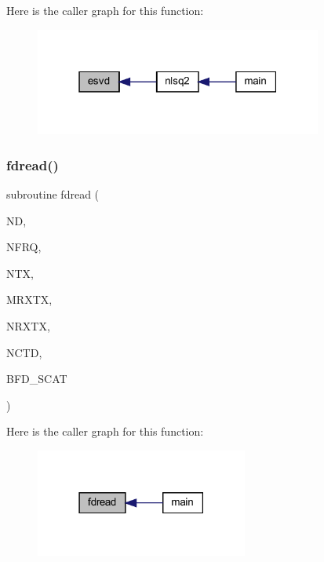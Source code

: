 Here is the caller graph for this function\+:\nopagebreak
\begin{figure}[H]
\begin{center}
\leavevmode
\includegraphics[width=268pt]{Leroi_8f90_a4ee1c663696c56423ddfdd31af7fbaa8_icgraph}
\end{center}
\end{figure}
\mbox{\label{Leroi_8f90_a51b5dc154d226d9db8556fde47af7ae9}} 
\subsubsection{\texorpdfstring{fdread()}{fdread()}}
{\footnotesize\ttfamily subroutine fdread (\begin{DoxyParamCaption}\item[{integer}]{ND,  }\item[{integer}]{N\+F\+RQ,  }\item[{integer}]{N\+TX,  }\item[{integer}]{M\+R\+X\+TX,  }\item[{integer, dimension(ntx)}]{N\+R\+X\+TX,  }\item[{integer, dimension(mrxtx,ntx)}]{N\+C\+TD,  }\item[{complex, dimension(nfrq,mrxtx,ntx,3)}]{B\+F\+D\+\_\+\+S\+C\+AT }\end{DoxyParamCaption})}

Here is the caller graph for this function\+:\nopagebreak
\begin{figure}[H]
\begin{center}
\leavevmode
\includegraphics[width=198pt]{Leroi_8f90_a51b5dc154d226d9db8556fde47af7ae9_icgraph}
\end{center}
\end{figure}
\mbox{\label{Leroi_8f90_adf5b72e5e0c8b51d6d076cc274531811}} 
